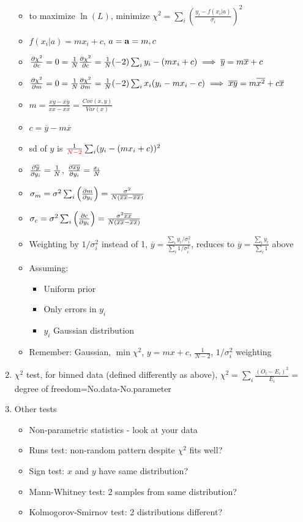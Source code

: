 \documentclass{article}
\theoremstyle{remark}
\theoremstyle{remark}
\begin{document}
\begin{enumerate}
\begin{itemize}
            \item to maximize $\ln(L)$, minimize $\chi^2=\sum_i\left(\frac{y_i-f(x_i|a)}{\sigma_i}\right)^2$
            \item $f(x_i|a)=mx_i+c$, $a=\vb{a}=m, c$
            \item $\pdv{\chi^2}{c}=0=\frac{1}{N}\pdv{\chi^2}{c}=\frac{1}{N}(-2)\sum_i y_i-(mx_i+c)\implies\overline{y}=m\overline{x}+c$
            \item $\pdv{\chi^2}{m}=0=\frac{1}{N}\pdv{\chi^2}{m}=\frac{1}{N}(-2)\sum_i x_i(y_i-mx_i-c)\implies\overline{xy}=m\overline{x^2}+c\overline{x}$
            \item $m=\frac{\overline{xy}-\overline{x}\overline{y}}{\overline{xx}-\overline{x}\overline{x}}=\frac{Cov(x,y)}{Var(x)}$
            \item $c=\overline{y}-m\overline{x}$
            \item sd of $y$ is $\frac{1}{\textcolor{red}{N-2}}\sum_i (y_i-(mx_i+c))^2$
            \item $\pdv{\overline{y}}{y_i}=\frac{1}{N}$, $\pdv{\overline{xy}}{y_i}=\frac{x_i}{N}$
            \item $\sigma_m=\sigma^2\sum_i\left(\pdv{m}{y_i}\right)=\frac{\sigma^2}{N(\overline{xx}-\overline{x}\overline{x})}$
            \item $\sigma_c=\sigma^2\sum_i\left(\pdv{c}{y_i}\right)=\frac{\sigma^2\overline{xx}}{N(\overline{xx}-\overline{x}\overline{x})}$
            \item Weighting by $1/\sigma_i^2$ instead of 1, $\overline{y}=\frac{\sum_i y_i/\sigma_i^2}{\sum_i1/\sigma_i^2}$, reduces to $\overline{y}=\frac{\sum_i y_i}{\sum_i 1}$ above
            \item Assuming: \begin{itemize}
                    \item Uniform prior
                    \item Only errors in $y_i$
                    \item $y_i$ Gaussian distribution
                \end{itemize}
            \item Remember: Gaussian, $\min\chi^2$, $y=mx+c$, $\frac{1}{N-2}$, $1/\sigma^2_i$ weighting
        \end{itemize}
    \item $\chi^2$ test, for binned data (defined differently as above), $\chi^2=\sum_i\frac{(O_i-E_i)^2}{E_i}=$degree of freedom=No.data-No.parameter
    \item Other tests\begin{itemize}
        \item Non-parametric statistics - look at your data
        \item Runs test: non-random pattern despite $\chi^2$ fits well?
        \item Sign test: $x$ and $y$ have same distribution?
        \item Mann-Whitney test: 2 samples from same distribution?
        \item Kolmogorov-Smirnov test: 2 distributions different?
    \end{itemize}
        

\end{enumerate}
\end{document}
